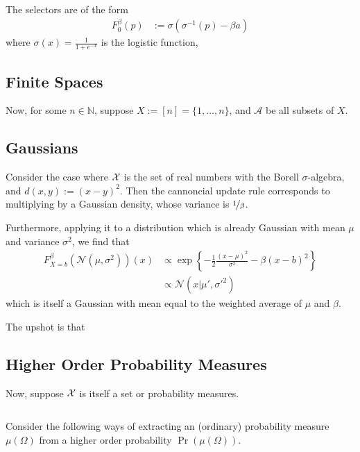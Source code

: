 \documentclass{article}
\begin{document}
The selectors are of the form
\begin{align*}
    F_0^\beta(p) &:= \sigma( \sigma^{-1}(p) - \beta a)
\end{align*}
where $\sigma(x) = \frac{1}{1 + e^{-x}}$ is the logistic function,

\subsection{Finite Spaces}
Now, for some $n \in \mathbb N$, suppose $X := [n] = \{1, \ldots, n\}$, and $\mathcal A$ be all subsets of $X$.

\subsection{Gaussians}
Consider the case where $\mathcal X$ is the set of real numbers with the Borell $\sigma$-algebra, and $d(x,y) := (x-y)^2$.
Then the cannoncial update rule corresponds to multiplying by a Gaussian density, whose variance is $\nicefrac1\beta$.

Furthermore, applying it to a distribution which is already Gaussian with mean $\mu$ and variance $\sigma^2$, we find that
\begin{align*}
    F^{\beta}_{X=b}(\mathcal N(\mu, \sigma^2))(x) &\propto
        \exp\left\{ - \frac12 \frac{(x-\mu)^2}{ \sigma^2 } - \beta(x-b)^2\right\}
    \\&\propto \mathcal N(x| \mu', \sigma'^2)
\end{align*}
which is itself a Gaussian with mean equal to the weighted average of $\mu$ and $\beta$.

The upshot is that


\subsection{Higher Order Probability Measures}
Now, suppose $\mathcal X$ is itself a set or probability measures.

\[
\]



Consider the following ways of extracting an (ordinary) probability measure $\mu(\Omega)$
from a higher order probability $\Pr(\mu(\Omega))$.
\end{document}
